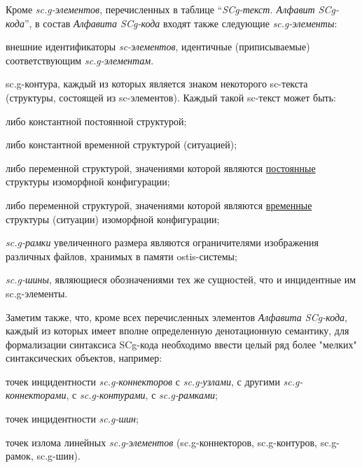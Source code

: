 Кроме\textit{ sc.g-элементов}, перечисленных в таблице ``\textit{SCg-текст. Алфавит SCg-кода}'', в состав \textit{Алфавита SCg-кода} входят также следующие \textit{sc.g-элементы}:
\begin{textitemize}
	\item внешние идентификаторы \textit{sc-элементов}, идентичные (приписываемые) соответствующим \textit{sc.g-элементам}.
	\item sc.g-контура, каждый из которых является знаком некоторого sc-текста (структуры, состоящей из sc-элементов). Каждый такой sc-текст может быть:
	\begin{textitemize}
		\item либо константной постоянной структурой;
		\item либо константной временной структурой (ситуацией);
		\item либо переменной структурой, значениями которой являются \uline{постоянные} структуры изоморфной  конфигурации;
		\item либо переменной структурой, значениями которой являются \uline{временные} структуры (ситуации) изоморфной  конфигурации;
	\end{textitemize}
	
	\item \textit{sc.g-рамки} увеличенного размера являются ограничителями изображения различных файлов, хранимых в памяти ostis-системы;
	\item \textit{sc.g-шины}, являющиеся обозначениями тех же сущностей, что и инцидентные им sc.g-элементы.
\end{textitemize}

Заметим также, что, кроме всех перечисленных элементов \textit{Алфавита SCg-кода}, каждый из которых имеет вполне определенную денотационную  семантику, для формализации синтаксиса SCg-кода необходимо ввести целый ряд более "мелких"{} синтаксических объектов, например:
\begin{textitemize}
	\item точек инцидентности \textit{sc.g-коннекторов} с \textit{sc.g-узлами}, с другими \textit{sc.g-коннекторами}, с \textit{sc.g-контурами}, с \textit{sc.g-рамками};
	\item точек инцидентности \textit{sc.g-шин};
	\item точек излома линейных \textit{sc.g-элементов} (sc.g-коннекторов, sc.g-контуров, sc.g-рамок, sc.g-шин).
\end{textitemize}

\newpage

